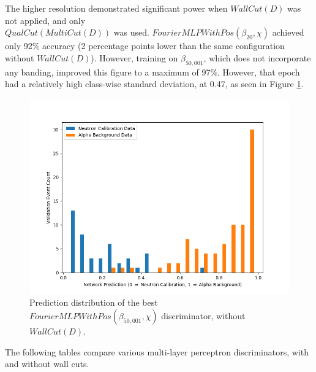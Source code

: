\documentclass[10pt]{article}
\begin{document}
The higher resolution demonstrated significant power when $WallCut(D)$ was not applied, and only \\ $QualCut(MultiCut(D))$ was used. $FourierMLPWithPos(\beta_{20}, \chi)$ achieved only 92\% accuracy (2 percentage points lower than the same configuration without $WallCut(D)$). However, training on $\beta_{50,001}$, which does not incorporate any banding, improved this figure to a maximum of 97\%. However, that epoch had a relatively high class-wise standard deviation, at 0.47, as seen in Figure \ref{high_freq_no_wall_hist}.

\begin{figure}[H]
    \centering
    \includegraphics[width=\textwidth]{high_freq_no_wall_hist}
    \caption{\label{high_freq_no_wall_hist} Prediction distribution of the best $FourierMLPWithPos(\beta_{50,001}, \chi)$ discriminator, without $WallCut(D)$.}
\end{figure}

The following tables compare various multi-layer perceptron discriminators, with and without wall cuts.
\end{document}
